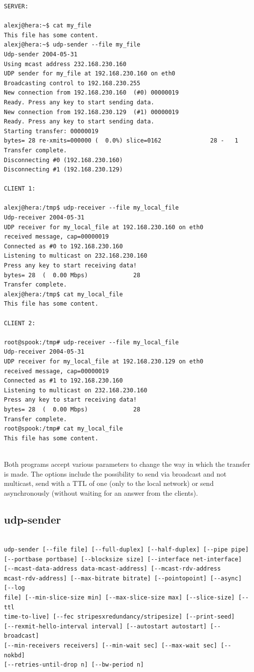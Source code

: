 \begin{lstlisting}[float,caption=File transfer from a server to two clients]
SERVER:

alexj@hera:~$ cat my_file 
This file has some content.
alexj@hera:~$ udp-sender --file my_file 
Udp-sender 2004-05-31
Using mcast address 232.168.230.160
UDP sender for my_file at 192.168.230.160 on eth0 
Broadcasting control to 192.168.230.255
New connection from 192.168.230.160  (#0) 00000019
Ready. Press any key to start sending data.
New connection from 192.168.230.129  (#1) 00000019
Ready. Press any key to start sending data.
Starting transfer: 00000019
bytes= 28 re-xmits=000000 (  0.0%) slice=0162              28 -   1
Transfer complete.
Disconnecting #0 (192.168.230.160)
Disconnecting #1 (192.168.230.129)

CLIENT 1:

alexj@hera:/tmp$ udp-receiver --file my_local_file
Udp-receiver 2004-05-31
UDP receiver for my_local_file at 192.168.230.160 on eth0
received message, cap=00000019
Connected as #0 to 192.168.230.160
Listening to multicast on 232.168.230.160
Press any key to start receiving data!
bytes= 28  (  0.00 Mbps)             28 
Transfer complete.
alexj@hera:/tmp$ cat my_local_file 
This file has some content.

CLIENT 2:

root@spook:/tmp# udp-receiver --file my_local_file
Udp-receiver 2004-05-31
UDP receiver for my_local_file at 192.168.230.129 on eth0
received message, cap=00000019
Connected as #1 to 192.168.230.160
Listening to multicast on 232.168.230.160
Press any key to start receiving data!
bytes= 28  (  0.00 Mbps)             28 
Transfer complete.
root@spook:/tmp# cat my_local_file 
This file has some content.


\end{lstlisting}


Both programs accept various parameters to change the way in which the
transfer is made. The options include the possibility to send via broadcast
and not multicast, send with a TTL of one (only to the local network) or
send asynchronously (without waiting for an answer from the clients).

\pagebreak
\subsection{udp-sender}
\begin{lstlisting}[caption=Command line flags for udp-sender]

udp-sender [--file file] [--full-duplex] [--half-duplex] [--pipe pipe]
[--portbase portbase] [--blocksize size] [--interface net-interface]
[--mcast-data-address data-mcast-address] [--mcast-rdv-address
mcast-rdv-address] [--max-bitrate bitrate] [--pointopoint] [--async] [--log
file] [--min-slice-size min] [--max-slice-size max] [--slice-size] [--ttl
time-to-live] [--fec stripesxredundancy/stripesize] [--print-seed]
[--rexmit-hello-interval interval] [--autostart autostart] [--broadcast]
[--min-receivers receivers] [--min-wait sec] [--max-wait sec] [--nokbd]
[--retries-until-drop n] [--bw-period n]

\end{lstlisting}



